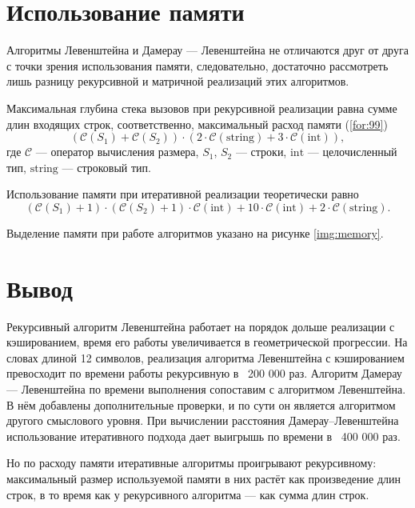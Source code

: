\captionsetup{singlelinecheck = false, justification=centering}

\section{Использование памяти}

Алгоритмы Левенштейна и Дамерау — Левенштейна не отличаются друг от друга с точки зрения использования памяти, следовательно, достаточно рассмотреть лишь разницу рекурсивной и матричной реализаций этих алгоритмов.

Максимальная глубина стека вызовов при рекурсивной реализации равна сумме длин входящих строк, соответственно, максимальный расход памяти (\ref{for:99})
\begin{equation}
(\mathcal{C}(S_1) + \mathcal{C}(S_2)) \cdot (2 \cdot \mathcal{C}\mathrm{(string)} + 3 \cdot \mathcal{C}\mathrm{(int)}),
\label{for:99}
\end{equation}
где $\mathcal{C}$ — оператор вычисления размера, $S_1$, $S_2$ — строки, $\mathrm{int}$ — целочисленный тип, $\mathrm{string}$ — строковый тип.

Использование памяти при итеративной реализации теоретически равно
\begin{equation}
(\mathcal{C}(S_1) + 1) \cdot (\mathcal{C}(S_2) + 1) \cdot \mathcal{C}\mathrm{(int)} + 10\cdot \mathcal{C}\mathrm{(int)} + 2 \cdot \mathcal{C}\mathrm{(string)}.
\end{equation}

Выделение памяти при работе алгоритмов указано на рисунке \ref{img:memory}.


\section{Вывод}

Рекурсивный алгоритм Левенштейна работает на порядок дольше  реализации с кэшированием, время его работы увеличивается в геометрической прогрессии. На словах длиной 12 символов, реализация алгоритма Левенштейна с кэшированием превосходит по времени работы рекурсивную в ~200 000 раз. Алгоритм Дамерау — Левенштейна по времени выполнения сопоставим с алгоритмом Левенштейна. В нём добавлены дополнительные проверки, и по сути он является алгоритмом другого смыслового уровня. При вычислении расстояния Дамерау--Левенштейна использование итеративного подхода дает выигрышь по времени в ~400 000 раз.

Но по расходу памяти итеративные алгоритмы проигрывают рекурсивному: максимальный размер используемой памяти в них растёт как произведение длин строк, в то время как у рекурсивного алгоритма — как сумма длин строк.
